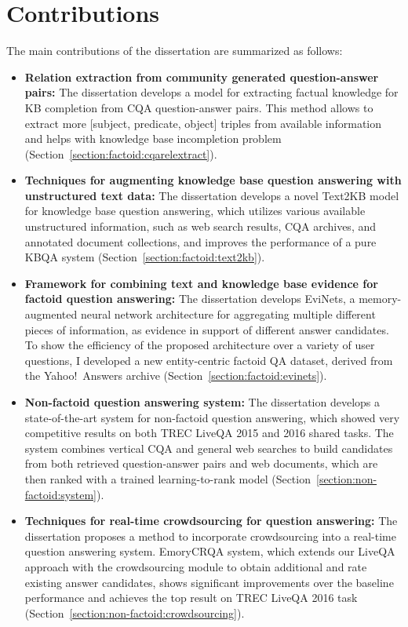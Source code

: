 \clearpage

\section{Contributions}
\label{section:intro:contributions}

The main contributions of the dissertation are summarized as follows:
\begin{itemize}
	\item \textbf{Relation extraction from community generated question-answer pairs:} The dissertation develops a model for extracting factual knowledge for KB completion from CQA question-answer pairs.
	This method allows to extract more [subject, predicate, object] triples from available information and helps with knowledge base incompletion problem (Section~\ref{section:factoid:cqarelextract}).
	\item \textbf{Techniques for augmenting knowledge base question answering with unstructured text data:} The dissertation develops a novel Text2KB model for knowledge base question answering, which utilizes various available unstructured information, such as web search results, CQA archives, and annotated document collections, and improves the performance of a pure KBQA system (Section~\ref{section:factoid:text2kb}).
	\item \textbf{Framework for combining text and knowledge base evidence for factoid question answering:} The dissertation develops EviNets, a memory-augmented neural network architecture for aggregating multiple different pieces of information, as evidence in support of different answer candidates.
	To show the efficiency of the proposed architecture over a variety of user questions, I developed a new entity-centric factoid QA dataset, derived from the Yahoo!~Answers archive (Section~\ref{section:factoid:evinets}).
	\item \textbf{Non-factoid question answering system:} The dissertation develops a state-of-the-art system for non-factoid question answering, which showed very competitive results on both TREC LiveQA 2015 and 2016 shared tasks.
	The system combines vertical CQA and general web searches to build candidates from both retrieved question-answer pairs and web documents, which are then ranked with a trained learning-to-rank model (Section~\ref{section:non-factoid:system}).
	\item \textbf{Techniques for real-time crowdsourcing for question answering:} The dissertation proposes a method to incorporate crowdsourcing into a real-time question answering system. EmoryCRQA system, which extends our LiveQA approach with the crowdsourcing module to obtain additional and rate existing answer candidates, shows significant improvements over the baseline performance and achieves the top result on TREC LiveQA 2016 task (Section~\ref{section:non-factoid:crowdsourcing}).

\end{itemize}
